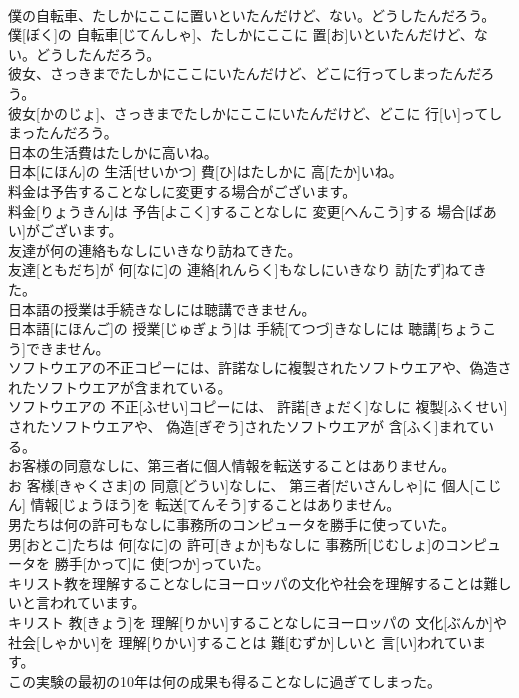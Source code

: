 \documentclass[8pt]{extreport}
\begin{document}
\begin{CJK}{UTF8}{min}
\\	僕の自転車、たしかにここに置いといたんだけど、ない。どうしたんだろう。	
\\	僕[ぼく]の 自転車[じてんしゃ]、たしかにここに 置[お]いといたんだけど、ない。どうしたんだろう。
\\	彼女、さっきまでたしかにここにいたんだけど、どこに行ってしまったんだろう。	
\\	彼女[かのじょ]、さっきまでたしかにここにいたんだけど、どこに 行[い]ってしまったんだろう。
\\	日本の生活費はたしかに高いね。	
\\	日本[にほん]の 生活[せいかつ] 費[ひ]はたしかに 高[たか]いね。
\\	料金は予告することなしに変更する場合がございます。	
\\	料金[りょうきん]は 予告[よこく]することなしに 変更[へんこう]する 場合[ばあい]がございます。
\\	友達が何の連絡もなしにいきなり訪ねてきた。	
\\	友達[ともだち]が 何[なに]の 連絡[れんらく]もなしにいきなり 訪[たず]ねてきた。
\\	日本語の授業は手続きなしには聴講できません。	
\\	日本語[にほんご]の 授業[じゅぎょう]は 手続[てつづ]きなしには 聴講[ちょうこう]できません。
\\	ソフトウエアの不正コピーには、許諾なしに複製されたソフトウエアや、偽造されたソフトウエアが含まれている。	
\\	ソフトウエアの 不正[ふせい]コピーには、 許諾[きょだく]なしに 複製[ふくせい]されたソフトウエアや、 偽造[ぎぞう]されたソフトウエアが 含[ふく]まれている。
\\	お客様の同意なしに、第三者に個人情報を転送することはありません。	
\\	お 客様[きゃくさま]の 同意[どうい]なしに、 第三者[だいさんしゃ]に 個人[こじん] 情報[じょうほう]を 転送[てんそう]することはありません。
\\	男たちは何の許可もなしに事務所のコンピュータを勝手に使っていた。	
\\	男[おとこ]たちは 何[なに]の 許可[きょか]もなしに 事務所[じむしょ]のコンピュータを 勝手[かって]に 使[つか]っていた。
\\	キリスト教を理解することなしにヨーロッパの文化や社会を理解することは難しいと言われています。	
\\	キリスト 教[きょう]を 理解[りかい]することなしにヨーロッパの 文化[ぶんか]や 社会[しゃかい]を 理解[りかい]することは 難[むずか]しいと 言[い]われています。
\\	この実験の最初の10年は何の成果も得ることなしに過ぎてしまった。	

\end{CJK}
\end{document}
